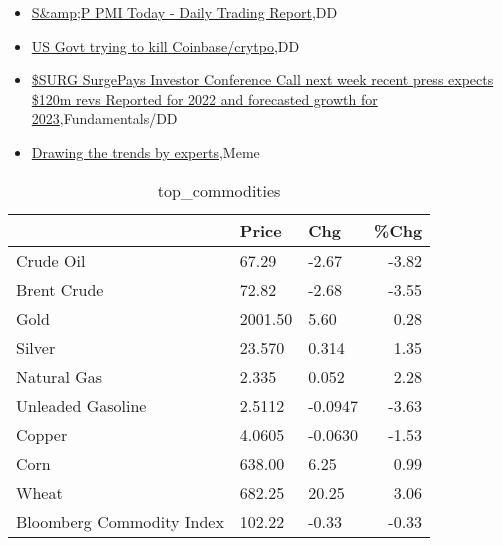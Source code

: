 \documentclass{article}%
\begin{document}
%
\begin{itemize}%
\item%
\href{https://reddit.com/r/wallstreetbets/comments/120j4g6/sp\_pmi\_today\_daily\_trading\_report/}{S\&amp;P PMI Today - Daily Trading Report},DD%
\item%
\href{https://reddit.com/r/wallstreetbets/comments/120ibmn/us\_govt\_trying\_to\_kill\_coinbasecrytpo/}{US Govt trying to kill Coinbase/crytpo},DD%
\item%
\href{https://reddit.com/r/StockMarket/comments/120iira/surg\_surgepays\_investor\_conference\_call\_next\_week/}{\$SURG SurgePays Investor Conference Call next week recent press expects \$120m revs Reported for 2022 and forecasted growth for 2023},Fundamentals/DD%
\item%
\href{https://reddit.com/r/StockMarket/comments/120ftsx/drawing\_the\_trends\_by\_experts/}{Drawing the trends by experts},Meme%
\end{itemize}%


\begin{table}[htbp]%
\caption{top\_commodities}%
\centering%
\begin{adjustbox}{width=1\textwidth}%
\begin{tabular}{lllr}
\toprule
                          &   Price &     Chg &  \%Chg \\
\midrule
               Crude Oil  &   67.29 &   -2.67 & -3.82 \\
             Brent Crude  &   72.82 &   -2.68 & -3.55 \\
                    Gold  & 2001.50 &    5.60 &  0.28 \\
                  Silver  &  23.570 &   0.314 &  1.35 \\
             Natural Gas  &   2.335 &   0.052 &  2.28 \\
       Unleaded Gasoline  &  2.5112 & -0.0947 & -3.63 \\
                  Copper  &  4.0605 & -0.0630 & -1.53 \\
                    Corn  &  638.00 &    6.25 &  0.99 \\
                   Wheat  &  682.25 &   20.25 &  3.06 \\
Bloomberg Commodity Index &  102.22 &   -0.33 & -0.33 \\
\bottomrule
\end{tabular}
%
\end{adjustbox}%
\end{table}

%
\end{document}
